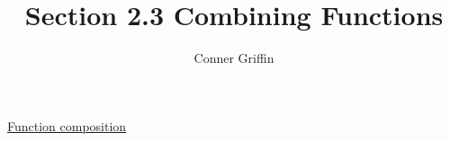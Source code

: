 \documentclass{ximera}
\title{Section 2.3 Combining Functions}
\author{Conner Griffin}
\begin{document}
\begin{abstract}
    
\end{abstract}
\maketitle





\underline{Function composition}




\end{document}
